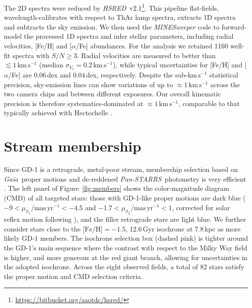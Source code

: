 \documentclass[twocolumn]{aastex63}
\newcommand{\package}[1]{\textsl{#1}}
\newcommand{\gaia}{\textsl{Gaia}}
\newcommand{\pans}{\textsl{Pan-STARRS}}
\newcommand{\kms}{\ensuremath{\textrm{km}\,\textrm{s}^{-1}}}
\newcommand{\masyr}{\ensuremath{\textrm{mas}\,\textrm{yr}^{-1}}}
\begin{document}
The 2D spectra were reduced by \package{HSRED}~v2.1\footnote{\url{https://bitbucket.org/saotdc/hsred/}}.
This pipeline flat-fields, wavelength-calibrates with respect to ThAr lamp spectra, extracts 1D spectra and subtracts the sky emission.
We then used the \package{MINESweeper} code \citep{cargile2019} to forward-model the processed 1D spectra and infer stellar parameters, including radial velocities, [Fe/H] and [$\alpha$/Fe] abundances.
For the analysis we retained 1160 well-fit spectra with $S/N\geq3$.
Radial velocities are measured to better than $\lesssim1\,\kms$ (median $\sigma_{V_r}=0.2\,\kms$), while typical uncertainties for [Fe/H] and [$\alpha$/Fe] are $0.06$\,dex and $0.04$\,dex, respectively.
Despite the sub-$\kms$ statistical precision, sky-emission lines can show variations of up to $\approx1\,\kms$ across the two camera chips and between different exposures.
Our overall kinematic precision is therefore systematics-dominated at $\approx1\,\kms$, comparable to that typically achieved with Hectochelle \citep[e.g.,][]{caldwell2017}.

\section{Stream membership}
\label{sec:membership}

Since GD-1 is a retrograde, metal-poor stream, membership selection based on \gaia\ proper motions \citep{gdr2} and de-reddened \pans\ photometry \citep{sfd, ps1} is very efficient \citep[e.g.,][]{pwb}.
The left panel of Figure~\ref{fig:members} shows the color-magnitude diagram (CMD) of all targeted stars: those with GD-1-like proper motions are dark blue ($-9<\mu_{\phi_1}/\masyr<-4.5$ and $-1.7<\mu_{\phi_2}/\masyr<1$, corrected for solar reflex motion following \citealt{pwb}), and the filler retrograde stars are light blue.
We further consider stars close to the $\textrm{[Fe/H]}=-1.5$, 12.6\,Gyr isochrone at 7.8\,kpc \citep{choi2016} as more likely GD-1 members.
The isochrone selection box (dashed pink) is tighter around the GD-1's main sequence where the contrast with respect to the Milky Way field is higher, and more generous at the red giant branch, allowing for uncertainties in the adopted isochrone.
Across the eight observed fields, a total of 82 stars satisfy the proper motion and CMD selection criteria.
\end{document}
